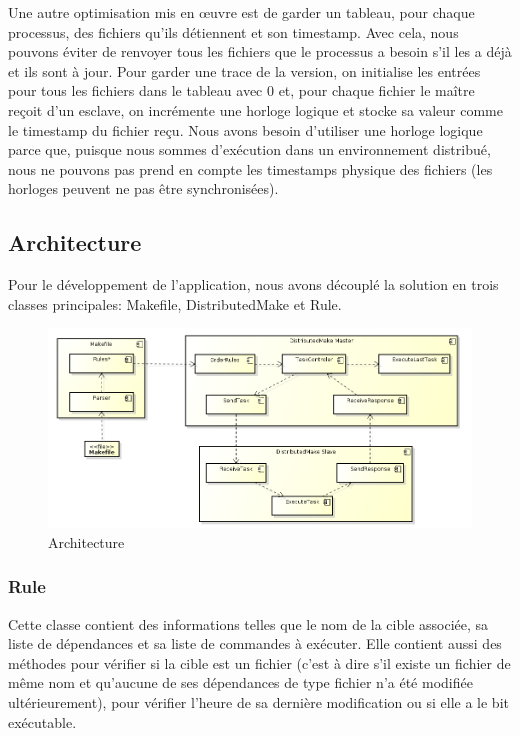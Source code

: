 \documentclass[a4paper,12pt,twoside]{article}
\begin{document}
Une autre optimisation mis en œuvre est de garder un tableau, pour chaque processus, des fichiers qu'ils détiennent et son timestamp. Avec cela, nous pouvons éviter de renvoyer tous les fichiers que le processus a besoin s'il les a déjà et ils sont à jour. Pour garder une trace de la version, on initialise les entrées pour tous les fichiers dans le tableau avec 0 et, pour chaque fichier le maître reçoit d'un esclave, on incrémente une horloge logique et stocke sa valeur comme le timestamp du fichier reçu. Nous avons besoin d'utiliser une horloge logique parce que, puisque nous sommes d'exécution dans un environnement distribué, nous ne pouvons pas prend en compte les timestamps physique des fichiers (les horloges peuvent ne pas être synchronisées).

\subsection{Architecture}

Pour le développement de l'application, nous avons découplé la solution en
trois classes principales: Makefile, DistributedMake et Rule.

\begin{figure}[H]
  \centering
  \includegraphics[scale=0.4]{schema.png}
  \caption{Architecture}
  \label{fig:architecture}
\end{figure}

\subsubsection{Rule}

Cette classe contient des informations telles que le nom de la cible
associée, sa liste de dépendances et sa liste de commandes à
exécuter. Elle contient aussi des méthodes pour vérifier si la cible
est un fichier (c'est à dire s'il existe un fichier de même nom et
qu'aucune de ses dépendances de type fichier n'a été modifiée
ultérieurement), pour vérifier l'heure de sa dernière modification ou
si elle a le bit exécutable.
\end{document}
